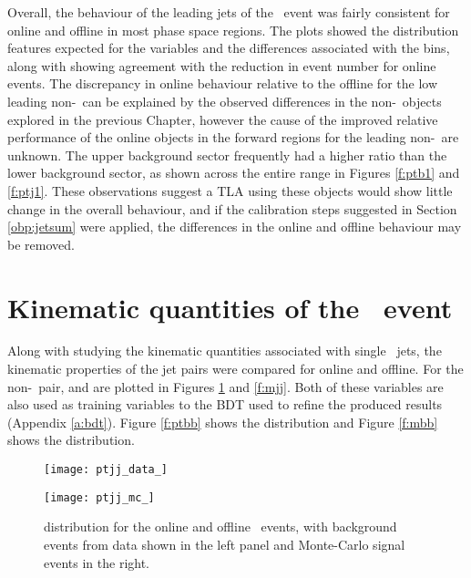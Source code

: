     Overall, the behaviour of the leading jets of the \VBFHBB\ event was fairly consistent for online and offline in most phase space regions. The plots showed the distribution features expected for the variables and the differences associated with the \mbb bins, along with showing agreement with the reduction in event number for online events. The discrepancy in online behaviour relative to the offline for the low \pt leading non-\bjets\ can be explained by the observed differences in the non-\bjet\ objects explored in the previous Chapter, however the cause of the improved relative performance of the online objects in the forward regions for the leading non-\bjet\ are unknown. The upper background sector frequently had a higher ratio than the lower background sector, as shown across the entire \pt range in Figures \ref{f:ptb1} and \ref{f:ptj1}. These observations suggest a TLA using these objects would show little change in the overall behaviour, and if the calibration steps suggested in Section \ref{obp:jetsum} were applied, the differences in the online and offline behaviour may be removed.


\section{Kinematic quantities of the \VBFHBB\ event}

	Along with studying the kinematic quantities associated with single \VBFHBB\ jets, the kinematic properties of the jet pairs were compared for online and offline. For the non-\bjet\ pair, \ptjj and \mjj are plotted in Figures \ref{f:ptjj} and \ref{f:mjj}. Both of these variables are also used as training variables to the BDT used to refine the produced results (Appendix \ref{a:bdt}). Figure \ref{f:ptbb} shows the \ptbb distribution and Figure \ref{f:mbb} shows the \mbb distribution.

        \begin{figure}[h]
            \centering
            \begin{minipage}[h]{0.48\linewidth}
                \texttt{[image: ptjj\_data\_]}
            \end{minipage}
            \quad
            \begin{minipage}[h]{0.48\linewidth}
                \texttt{[image: ptjj\_mc\_]}
            \end{minipage}
            \caption[Comparison of the \ptjj distribution of the \VBFHBB\ events for HLT and offline objects]{\ptjj distribution for the online and offline \VBFHBB\ events, with background events from data shown in the left panel and Monte-Carlo signal events in the right.}
        	\label{f:ptjj}
        \end{figure}


